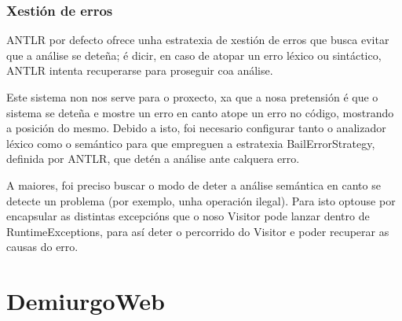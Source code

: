 \subsubsection{Xestión de erros}
ANTLR por defecto ofrece unha estratexia de xestión de erros que busca evitar
que a análise se deteña; é dicir, en caso de atopar un erro léxico ou
sintáctico, ANTLR intenta recuperarse para proseguir coa análise.
\par
Este sistema non nos serve para o proxecto, xa que a nosa pretensión é que o
sistema se deteña e mostre un erro en canto atope un erro no código, mostrando a
posición do mesmo. Debido a isto, foi necesario configurar tanto o analizador
léxico como o semántico para que empreguen a estratexia BailErrorStrategy,
definida por ANTLR, que detén a análise ante calquera erro.
\par
A maiores, foi preciso buscar o modo de deter a análise semántica en canto se
detecte un problema (por exemplo, unha operación ilegal). Para isto optouse por
encapsular as distintas excepcións que o noso Visitor pode lanzar dentro de
RuntimeExceptions, para así deter o percorrido do Visitor e poder recuperar as
causas do erro.

\section{DemiurgoWeb}